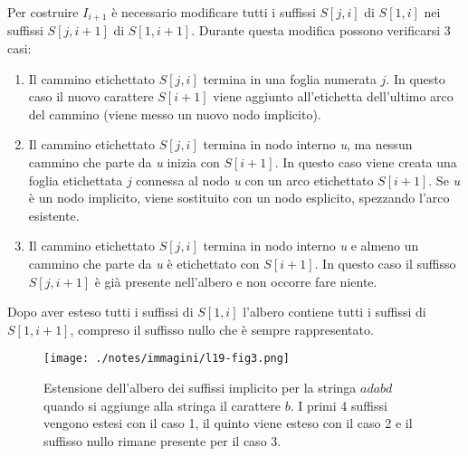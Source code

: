 Per costruire $ I_{i+1} $ è necessario modificare tutti i suffissi $ S[j,i] $ di $ S[1,i] $ nei suffissi $ S[j,i+1] $ di $ S[1,i+1] $.
Durante questa modifica possono verificarsi 3 casi:

\begin{enumerate}
	\item Il cammino etichettato $ S[j,i] $ termina in una foglia numerata $ j $. In questo caso il nuovo carattere $ S[i+1] $ viene aggiunto all'etichetta dell'ultimo arco del cammino (viene messo un nuovo nodo implicito).
	\item Il cammino etichettato $ S[j,i] $ termina in nodo interno \textit{u}, ma nessun cammino che parte da \textit{u} inizia con $ S[i+1] $. In questo caso viene creata una foglia etichettata $ j $ connessa al nodo \textit{u} con un arco etichettato $ S[i+1] $. Se \textit{u} è un nodo implicito, viene sostituito con un nodo esplicito, spezzando l'arco esistente.
	\item Il cammino etichettato $ S[j,i] $ termina in nodo interno \textit{u} e almeno un cammino che parte da \textit{u} è etichettato con $ S[i+1] $. In questo caso il suffisso $ S[j,i+1] $ è già presente nell'albero e non occorre fare niente.
\end{enumerate}

Dopo aver esteso tutti i suffissi di $ S[1,i] $ l'albero contiene tutti i suffissi di $ S[1,i+1] $, compreso il suffisso nullo che è sempre rappresentato.

\begin{figure}[htbp]
	\centering
	\texttt{[image: ./notes/immagini/l19-fig3.png]}
	\caption{Estensione dell'albero dei suffissi implicito per la stringa $ adabd $ quando si aggiunge alla stringa il carattere $ b $. I primi 4 suffissi vengono estesi con il caso 1, il quinto viene esteso con il caso 2 e il suffisso nullo rimane presente per il caso 3.}
\end{figure}


